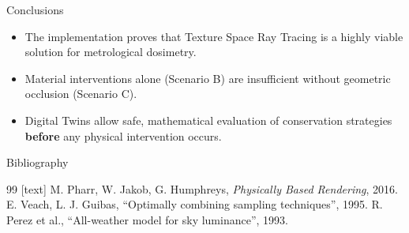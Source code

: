 \documentclass[aspectratio=169]{beamer}
\begin{document}
\begin{frame}{Conclusions}
    \begin{itemize}
        \item The implementation proves that Texture Space Ray Tracing is a highly viable solution for metrological dosimetry.
        \item Material interventions alone (Scenario B) are insufficient without geometric occlusion (Scenario C).
        \item Digital Twins allow safe, mathematical evaluation of conservation strategies \textbf{before} any physical intervention occurs.
    \end{itemize}
\end{frame}

\begin{frame}{Bibliography}
    \begin{thebibliography}{99}
        [text]
         M. Pharr, W. Jakob, G. Humphreys, \textit{Physically Based Rendering}, 2016.
         E. Veach, L. J. Guibas, ``Optimally combining sampling techniques'', 1995.
         R. Perez et al., ``All-weather model for sky luminance'', 1993.
    \end{thebibliography}
\end{frame}
\end{document}
